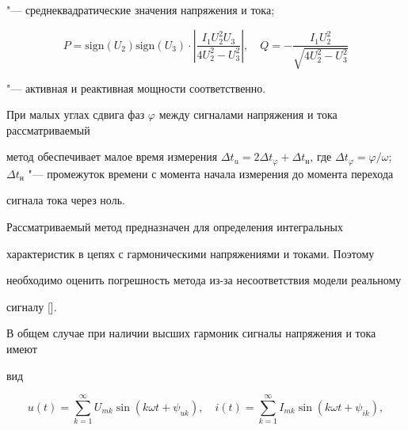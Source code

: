 "--- среднеквадратические значения напряжения и тока;



\begin{equation}


P=\text{sign}\left( U_2 \right) \text{sign} \left( U_3 \right)\cdot \left| \frac{I_1 U_2^2

U_3}{4U_2^2 - U_3^2}\right|,\quad

Q=-\frac{I_1 U_2^2}{\sqrt {4U_2^2 - U_3^2}}

\label{mel10:eq4}

\end{equation}

"--- активная и реактивная мощности соответственно.



При малых углах сдвига фаз $\varphi$ между сигналами напряжения и тока рассматриваемый

метод обеспечивает малое время измерения $\Delta t_u = 2 \Delta t_\varphi

+\Delta t_{\text{н}} $, где \mbox{$\Delta t_\varphi{=}{\varphi}/{\omega}$}; $\Delta

t_{\text{н}}$ "--- промежуток времени с момента начала измерения до момента перехода

сигнала тока через ноль.



Рассматриваемый метод предназначен для определения интегральных

характеристик в цепях с гармоническими напряжениями и токами. Поэтому

необходимо оценить погрешность метода из-за несоответствия модели реальному

сигналу [].



В общем случае при наличии высших гармоник сигналы напряжения и тока имеют

вид

\begin{equation}

\label{mel10:eq5}

u\left( t \right)=\sum \limits_{k=1}^\infty U_{mk} \sin \left( k\omega

t+\psi _{uk} \right),\quad 


i\left( t \right)=\sum\limits_{k=1}^\infty I_{mk} \sin \left( k\omega

t+\psi_{ik} \right),

\end{equation}

